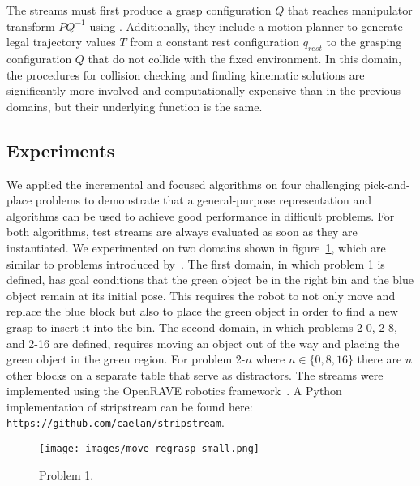 \documentclass[letterpaper]{article} %
\theoremstyle{plain}\newtheorem{thm}{Theorem}
\theoremstyle{definition}\newtheorem{defn}{Definition}
\theoremstyle{plain}\newtheorem{lem}{Lemma}
\theoremstyle{plain}\newtheorem{cor}{Corollary}
\newcommand{\algname}{{\sc strips}tream}
\newcommand{\eager}{incremental}
\newcommand{\focused}{focused}
\begin{document}
The  streams must first produce a grasp configuration $Q$
that reaches manipulator transform $PQ^{-1}$ using . Additionally, they include 
a motion planner  to generate legal trajectory values $T$ from a constant rest configuration $q_{rest}$
to the grasping configuration $Q$ that do not
collide with the fixed environment. In this domain, the procedures for collision checking and 
finding kinematic solutions are significantly more involved and
computationally expensive than in the previous domains, but their
underlying function is the same.

\subsection{Experiments}

We applied the \eager{} and \focused{} algorithms on four challenging
pick-and-place problems to demonstrate that a general-purpose
representation and algorithms can be used to achieve good performance
in difficult problems.  For both algorithms, test streams are
always evaluated as soon as they are instantiated.  
We experimented on two domains shown in
figure~\ref{fig:tamp_domains}, which are similar to problems
introduced by~\cite{GarrettIROS15}. The first domain, in which problem 1 is
defined, has goal conditions that the green object be in the right bin
and the blue object remain at its initial pose. This requires the
robot to not only move and replace the blue block but also to place
the green object in order to find a new grasp to insert it into the
bin.  The second domain, in which problems 2-0, 2-8, and 2-16 are
defined, requires moving an object out of the way and placing the
green object in the green region. For problem 2-$n$ where
$n \in \{0, 8, 16\}$ there are $n$ other blocks on a separate table
that serve as distractors. The streams were implemented using
the OpenRAVE robotics framework~\cite{openrave}.
A Python implementation of \algname{} can be found here:
\texttt{https://github.com/caelan/stripstream}.

\begin{figure}[h]
\centering
\texttt{[image: images/move\_regrasp\_small.png]}
\caption{Problem 1.} 
\label{fig:tamp_domains}
\end{figure}
\end{document}
